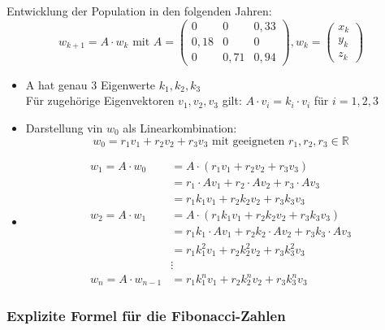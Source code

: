 \documentclass{article}
\newcommand{\R}{\mathbb{R}}
\newcommand{\vvvec}[3]{\begin{pmatrix}#1\\#2\\#3\end{pmatrix}}
\begin{document}
Entwicklung der Population in den folgenden Jahren:
\[
    w_{k+1} = A \cdot w_k \text{ mit } A = \begin{pmatrix}
        0 & 0 & 0,33\\
        0,18 & 0 & 0\\
        0 & 0,71& 0,94
    \end{pmatrix}, w_k = \vvvec{x_k}{y_k}{z_k}
\]
\begin{itemize}
    \item A hat genau 3 Eigenwerte $k_1, k_2, k_3$\\
    Für zugehörige Eigenvektoren $v_1, v_2, v_3$ gilt: $A \cdot v_i = k_i \cdot v_i$ für $i = 1,2,3$
    \item Darstellung vin $w_0$ als Linearkombination:
    \[
        w_0 = r_1v_1 + r_2v_2 + r_3v_3 \text{ mit geeigneten } r_1, r_2, r_3 \in \R
    \]
    \item \begin{align*}
        w_1 = A \cdot w_0 &= A \cdot (r_1v_1 + r_2v_2 + r_3v_3)\\
        &= r_1 \cdot Av_1 + r_2 \cdot Av_2 + r_3 \cdot Av_3\\
        &= r_1k_1v_1 + r_2k_2v_2 + r_3k_3v_3\\
        w_2 = A \cdot w_1 &= A \cdot (r_1k_1v_1 + r_2k_2v_2 + r_3k_3v_3)\\
        &= r_1k_1 \cdot Av_1 + r_2k_2 \cdot Av_2 + r_3k_3 \cdot Av_3\\
        &= r_1k_1^2v_1 + r_2k_2^2v_2 + r_3k_3^2v_3\\
        &\vdots\\
        w_n = A \cdot w_{n-1} &= r_1k_1^nv_1 + r_2k_2^nv_2 + r_3k_3^nv_3
    \end{align*}
\end{itemize}

\subsubsection{Explizite Formel für die Fibonacci-Zahlen}
\end{document}
